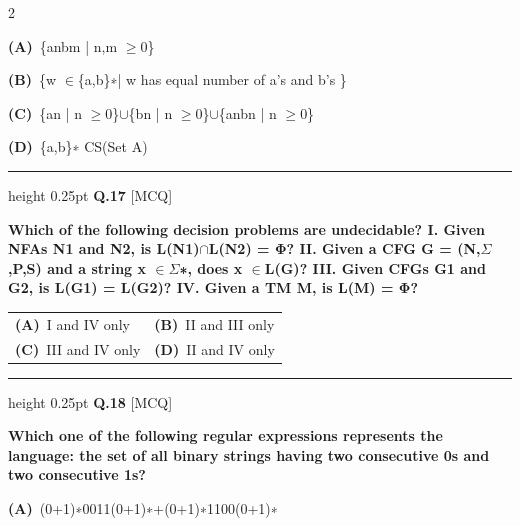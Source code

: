 \documentclass[a4paper,10pt,twoside]{article}
\begin{document}
\begin{multicols}{2}
\par\vspace{2pt}\noindent
\textbf{(A)}~\{anbm | n,m $\ge$0\}\par\vspace{2pt}\noindent
\textbf{(B)}~\{w $\in$\{a,b\}∗| w has equal number of a's and b's \}\par\vspace{2pt}\noindent
\textbf{(C)}~\{an | n $\ge$0\}$\cup$\{bn | n $\ge$0\}$\cup$\{anbn | n $\ge$0\}\par\vspace{2pt}\noindent
\textbf{(D)}~\{a,b\}∗ \newline CS(Set A)
\par\vspace{6pt}\hrule height 0.25pt\vspace{6pt}
\noindent\textbf{Q.17} \hfill {\footnotesize\textsf{[MCQ]}}
\par\vspace{2pt}
{\bfseries Which of the following decision problems are undecidable?
I. Given NFAs N1 and N2, is L(N1)$\cap$L(N2) = Φ?
II. Given a CFG G = (N,$\Sigma$,P,S) and a string x $\in$$\Sigma$∗, does x $\in$L(G)?
III. Given CFGs G1 and G2, is L(G1) = L(G2)?
IV. Given a TM M, is L(M) = Φ? \par}
\par\vspace{2pt}\noindent
\begin{tabular*}{\columnwidth}{@{\extracolsep{\fill}}p{}p{}@{}}
\textbf{(A)}~I and IV only & \textbf{(B)}~II and III only \\
\addlinespace[2pt]
\textbf{(C)}~III and IV only & \textbf{(D)}~II and IV only
\end{tabular*}
\par\vspace{6pt}\hrule height 0.25pt\vspace{6pt}
\noindent\textbf{Q.18} \hfill {\footnotesize\textsf{[MCQ]}}
\par\vspace{2pt}
{\bfseries Which one of the following regular expressions represents the language: the set of all binary
strings having two consecutive 0s and two consecutive 1s? \par}
\par\vspace{2pt}\noindent
\textbf{(A)}~(0+1)∗0011(0+1)∗+(0+1)∗1100(0+1)∗\par\vspace{2pt}\noindent

\end{multicols}
\end{document}
